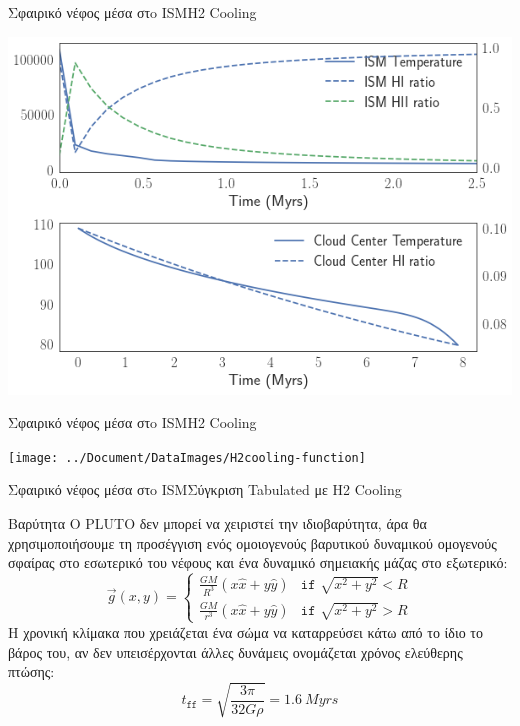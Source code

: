 \documentclass{beamer}
\begin{document}
\begin{frame}{Σφαιρικό νέφος μέσα στo ISM}{Η2 Cooling}
\begin{center}
	\includegraphics[width=0.8\linewidth]{../Document/DataImages/H2CoolingTMPcenterISM}
\end{center}
\end{frame}

\begin{frame}{Σφαιρικό νέφος μέσα στo ISM}{Η2 Cooling}
\begin{center}
	\texttt{[image: ../Document/DataImages/Η2cooling-function]}
\end{center}
\end{frame}

\begin{frame}{Σφαιρικό νέφος μέσα στo ISM}{Σύγκριση Tabulated με Η2 Cooling}
	
\end{frame}


\begin{frame}{Βαρύτητα}%
	Ο PLUTO δεν μπορεί να χειριστεί την ιδιοβαρύτητα, άρα θα χρησιμοποιήσουμε τη προσέγγιση ενός ομοιογενούς βαρυτικού δυναμικού ομογενούς σφαίρας στο εσωτερικό του νέφους και ένα δυναμικό σημειακής μάζας στο εξωτερικό:
	\begin{equation}
	\vec{g}(x,y) = 
	\begin{cases}
	\frac{GM}{R^3}(x \hat{x}+ y \hat{y}) &\texttt{if } \sqrt{x^2+y^2}<R \\
	\frac{GM}{r^3}(x \hat{x}+ y \hat{y}) &\texttt{if } \sqrt{x^2+y^2}>R
	\end{cases}
	\end{equation}
		Η χρονική κλίμακα που χρειάζεται ένα σώμα να καταρρεύσει κάτω από το ίδιο το βάρος του, αν δεν υπεισέρχονται άλλες δυνάμεις ονομάζεται χρόνος ελεύθερης πτώσης:
	\begin{equation}
	t_\texttt{ff}=\sqrt{\frac{3\pi}{32G\rho}} =  \SI{1.6}{Myrs}
	\end{equation}
\end{frame}
\end{document}
